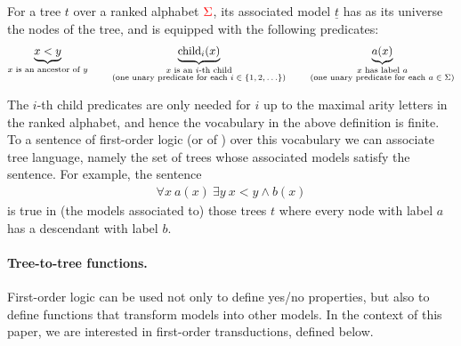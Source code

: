 \begin{definition}\label{def:tree-model}
   For a tree $t$  over a ranked alphabet ${\color{red}{\Sigma}}$, its associated model $\underline t$ has as its universe the nodes of the tree, and is equipped with the following predicates:
    \begin{align*}
        \underbrace{x < y}_{\substack{\text{$x$ is an ancestor of $y$}}} \qquad \underbrace{\mathrm{child}_i(x)}_{\substack{\text{$x$ is an $i$-th child}\\ \text{(one unary predicate for each $i\in \{1,2,\ldots\}$)}}}
        \qquad \underbrace{a(x)}_{\substack{\text{$x$ has label $a$}\\ \text{(one unary predicate for each $a \in \Sigma$)}}}
    \end{align*}
    \end{definition}

The $i$-th child predicates are only needed for $i$ up to the maximal arity letters in the ranked alphabet, and hence the vocabulary in the above definition is finite. 
 To  a sentence of first-order logic (or of \mso)  over this vocabulary  we can associate tree language, namely the set of trees whose associated models satisfy the sentence.  For example, the sentence 
 \begin{align*}
 \forall x \ a(x) \ \exists y \ x < y \land b(x)
 \end{align*} 
 is true in (the models associated to) those trees $t$ where every node with label $a$ has a descendant with label $b$.  
 
 \paragraph*{Tree-to-tree functions.}
First-order logic can be used not only to define yes/no properties, but also to define functions that transform models into other models. In the context of this paper, we are interested in first-order transductions, defined below. 

